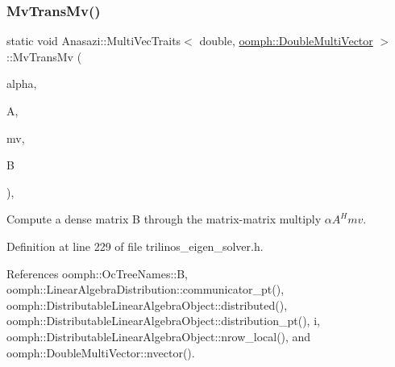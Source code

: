 \subsubsection{\texorpdfstring{Mv\+Trans\+Mv()}{MvTransMv()}}
{\footnotesize\ttfamily static void Anasazi\+::\+Multi\+Vec\+Traits$<$ double, \hyperlink{classoomph_1_1DoubleMultiVector}{oomph\+::\+Double\+Multi\+Vector} $>$\+::Mv\+Trans\+Mv (\begin{DoxyParamCaption}\item[{const double}]{alpha,  }\item[{const \hyperlink{classoomph_1_1DoubleMultiVector}{oomph\+::\+Double\+Multi\+Vector} \&}]{A,  }\item[{const \hyperlink{classoomph_1_1DoubleMultiVector}{oomph\+::\+Double\+Multi\+Vector} \&}]{mv,  }\item[{Teuchos\+::\+Serial\+Dense\+Matrix$<$ int, double $>$ \&}]{B }\end{DoxyParamCaption})\hspace{0.3cm}{\ttfamily [inline]}, {\ttfamily [static]}}



Compute a dense matrix {\ttfamily B} through the matrix-\/matrix multiply $ \alpha A^Hmv $. 



Definition at line 229 of file trilinos\+\_\+eigen\+\_\+solver.\+h.



References oomph\+::\+Oc\+Tree\+Names\+::B, oomph\+::\+Linear\+Algebra\+Distribution\+::communicator\+\_\+pt(), oomph\+::\+Distributable\+Linear\+Algebra\+Object\+::distributed(), oomph\+::\+Distributable\+Linear\+Algebra\+Object\+::distribution\+\_\+pt(), i, oomph\+::\+Distributable\+Linear\+Algebra\+Object\+::nrow\+\_\+local(), and oomph\+::\+Double\+Multi\+Vector\+::nvector().

\mbox{\label{classAnasazi_1_1MultiVecTraits_3_01double_00_01oomph_1_1DoubleMultiVector_01_4_ac52b7e1d688acef2afc3636e1cf7a58a}} 
